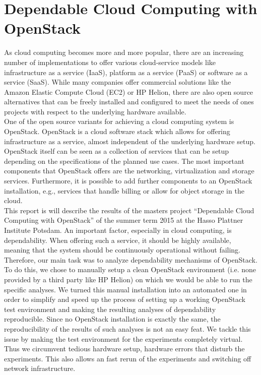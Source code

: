 \section[Dependable Cloud Computing with OpenStack \texorpdfstring{{\textbf{\tiny \enspace (JE, SK, NK)}}}{}]{Dependable Cloud Computing with OpenStack}
\label{introduction}

As cloud computing becomes more and more popular, there are an increasing number of  implementations to offer various cloud-service models like infrastructure as a service (IaaS), platform as a service (PaaS) or software as a service (SaaS). While many companies offer commercial solutions like the Amazon Elastic Compute Cloud (EC2) or HP Helion, there are also open source alternatives that can be freely installed and configured to meet the needs of ones projects with respect to the underlying hardware available.\\

One of the open source variants for achieving a cloud computing system is OpenStack. OpenStack is a cloud software stack which allows for offering infrastructure as a service, almost independent of the underlying hardware setup. OpenStack itself can be seen as a collection of services that can be setup depending on the specifications of the planned use cases. The most important components that OpenStack offers are the networking, virtualization and storage services. Furthermore, it is possible to add further components to an OpenStack installation, e.g., services that handle billing or allow for object storage in the cloud. \\

This report is will describe the results of the masters project ``Dependable Cloud Computing with OpenStack'' of the summer term 2015 at the Hasso Plattner Institute Potsdam. An important factor, especially in cloud computing, is dependability. When offering such a service, it should be highly available, meaning that the system should be continuously operational without failing. Therefore, our main task was to analyze dependability mechanisms of OpenStack. To do this, we chose to manually setup a clean OpenStack environment (i.e. none provided by a third party like HP Helion) on which we would be able to run the specific analyses. We turned this manual installation into an automated one in order to simplify and speed up the process of setting up a working OpenStack test environment and making the resulting analyses of dependability reproducible. Since no OpenStack installation is exactly the same, the reproducibility of the results of such analyses is not an easy feat. We tackle this issue by making the test environment for the experiments completely virtual. Thus we circumvent tedious hardware setup, hardware errors that disturb the experiments. This also allows an fast rerun of the experiments and switching off network infrastructure. \\


